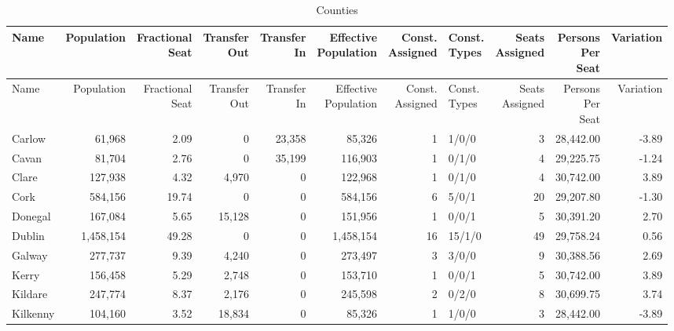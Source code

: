 \documentclass[a4paper]{article}
\begin{document}
\begin{longtable}{lrrrrrrlrrr}
\caption{Counties}
\\ \toprule
Name &Population &\shortstack{Fractional\\Seat} &\shortstack{Transfer\\Out} &\shortstack{Transfer\\In} &\shortstack{Effective\\Population} &\shortstack{Const.\\Assigned} &\shortstack{Const.\\Types} &\shortstack{Seats\\Assigned} &\shortstack{Persons\\Per\\Seat} &Variation \\ \midrule
\endfirsthead
\toprule
Name &Population &\shortstack{Fractional\\Seat} &\shortstack{Transfer\\Out} &\shortstack{Transfer\\In} &\shortstack{Effective\\Population} &\shortstack{Const.\\Assigned} &\shortstack{Const.\\Types} &\shortstack{Seats\\Assigned} &\shortstack{Persons\\Per\\Seat} &Variation \\ \midrule
\endhead
\bottomrule
\endfoot
Carlow&61,968& 2.09&0&23,358&85,326&1&1/0/0&3&28,442.00&-3.89\\ 
Cavan&81,704& 2.76&0&35,199&116,903&1&0/1/0&4&29,225.75&-1.24\\ 
Clare&127,938& 4.32&4,970&0&122,968&1&0/1/0&4&30,742.00& 3.89\\ 
Cork&584,156&19.74&0&0&584,156&6&5/0/1&20&29,207.80&-1.30\\ 
Donegal&167,084& 5.65&15,128&0&151,956&1&0/0/1&5&30,391.20& 2.70\\ 
Dublin&1,458,154&49.28&0&0&1,458,154&16&15/1/0&49&29,758.24& 0.56\\ 
Galway&277,737& 9.39&4,240&0&273,497&3&3/0/0&9&30,388.56& 2.69\\ 
Kerry&156,458& 5.29&2,748&0&153,710&1&0/0/1&5&30,742.00& 3.89\\ 
Kildare&247,774& 8.37&2,176&0&245,598&2&0/2/0&8&30,699.75& 3.74\\ 
Kilkenny&104,160& 3.52&18,834&0&85,326&1&1/0/0&3&28,442.00&-3.89\\ 

\end{longtable}
\end{document}
